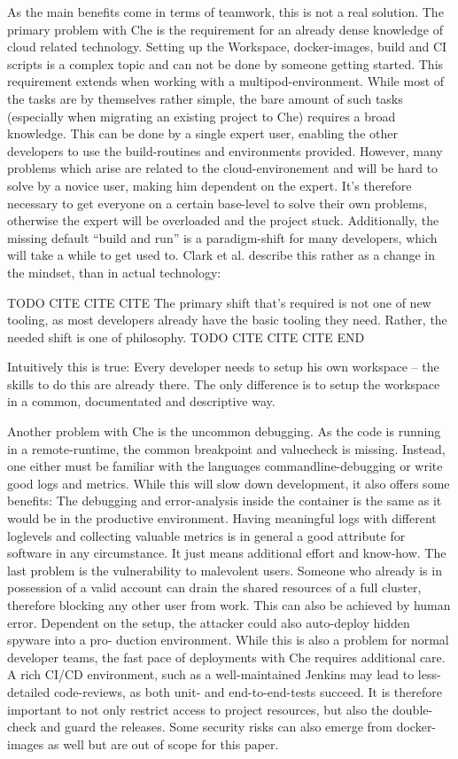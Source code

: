 \documentclass[utf8]{lni}
\begin{document}
As the main benefits come in terms of teamwork, this is not a real solution.
The primary problem with Che is the requirement for an already dense knowledge of cloud related technology.
Setting up the Workspace, docker-images, build and CI scripts is a complex topic and can not be done by someone getting started. 
This requirement extends when working with a multipod-environment. 
While most of the tasks are by themselves rather simple, the bare amount of such tasks (especially when migrating an existing project to Che) requires a broad knowledge.
This can be done by a single expert user, enabling the other developers  to  use  the  build-routines and  environments provided. 
However, many problems which arise are related to the cloud-environement and will be hard to solve by a novice user, making him dependent on the expert. 
It's therefore necessary to get everyone on a certain base-level to solve their own problems, otherwise the expert will be overloaded and the project stuck.  
Additionally, the missing default “build and run” is a paradigm-shift for many developers, which will take a while to get used to. 
Clark et al. \cite{CL14} describe this rather as a change in the mindset, than in actual technology: 

TODO CITE CITE CITE
The primary shift that’s required is not one of new tooling, as most developers already have the basic tooling they need. 
Rather, the needed shift is one of philosophy. 
TODO CITE CITE CITE END

Intuitively this is true: Every developer needs to setup his own workspace – the skills to do this are already there. 
The only difference is to setup the workspace in a common, documentated and descriptive way. 

Another problem with Che is the uncommon debugging. 
As the code is running in a remote-runtime, the common breakpoint  and  valuecheck
is  missing.  
Instead,  one  either must be familiar with the languages commandline-debugging or write good logs and metrics. 
While this will slow down development, it also offers some benefits: 
The debugging and error-analysis inside the container is the same as it would be in the productive environment. 
Having meaningful logs with different loglevels and collecting valuable metrics is 
in general a good attribute for software in any circumstance. 
It just means additional effort and know-how.  
The last problem is the vulnerability to malevolent users. 
Someone who already is in possession of a valid account can drain the shared resources of a full cluster, therefore blocking  any  other  user  from  work.
This  can  also  be achieved by human error. 
Dependent on the setup, the attacker could also auto-deploy hidden spyware into a pro-
duction environment. 
While this is also a problem for normal developer teams, the fast pace of deployments with Che requires additional care. 
A rich CI/CD environment, such as a well-maintained Jenkins may lead to less-detailed code-reviews, as both unit- and end-to-end-tests succeed.  
It is therefore important to not only restrict access to project resources, but also the double-check and guard the releases.  
Some security risks can also emerge from docker-images as well \cite{PE13} but are out of scope for this paper.
\end{document}
